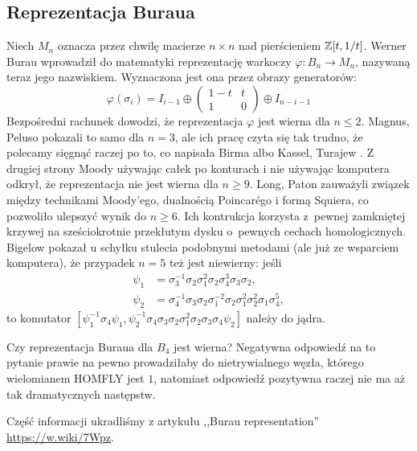 
\subsection{Reprezentacja Buraua}
Niech $M_n$ oznacza przez chwilę macierze $n \times n$ nad pierścieniem $\mathbb Z[t, 1/t]$.
Werner Burau \cite{burau1935} wprowadził do matematyki reprezentację warkoczy $\varphi \colon B_n \to M_{n}$, nazywaną teraz jego nazwiskiem.
%
%
Wyznaczona jest ona przez obrazy generatorów:
\begin{equation}
    \varphi(\sigma_i) = I_{i-1} \oplus \begin{pmatrix}
        1-t & t \\
        1   & 0
    \end{pmatrix} \oplus I_{n-i-1}
\end{equation}
Bezpośredni rachunek dowodzi, że reprezentacja $\varphi$ jest wierna dla $n \le 2$.
Magnus, Peluso \cite{magnus1969} pokazali to samo dla $n = 3$, ale ich pracę czyta się tak trudno, że polecamy sięgnąć raczej po to, co napisała Birma \cite[s. 129]{birman1974} albo Kassel, Turajew \cite[s. 110]{kassel2008}.
Z drugiej strony Moody \cite{moody1991} używając całek po konturach i nie używając komputera odkrył, że reprezentacja nie jest wierna dla $n \ge 9$.
%
Long, Paton \cite{long1993} zauważyli związek między technikami Moody'ego, dualnością Poincarégo i formą Squiera, co pozwoliło ulepszyć wynik do $n \ge 6$.
%
%
Ich kontrukcja korzysta z~pewnej zamkniętej krzywej na sześciokrotnie przekłutym dysku o~pewnych cechach homologicznych.
Bigelow \cite{bigelow1999} pokazał u schyłku stulecia podobnymi metodami (ale już ze wsparciem komputera), że przypadek $n = 5$ też jest niewierny: jeśli
%
\begin{align}
    \psi_1 & = \sigma_3^{{-1}}\sigma_2\sigma_1^2\sigma_2\sigma_4^3\sigma_3\sigma_2, \\
\psi_2 & = \sigma_4^{{-1}}\sigma_3\sigma_2\sigma_1^{{-2}}\sigma_2\sigma_1^2\sigma_2^2\sigma_1\sigma_4^5,
\end{align}
to komutator $[\psi_1^{{-1}}\sigma_4\psi_1,\psi_2^{{-1}}\sigma_4\sigma_3\sigma_2\sigma_1^2\sigma_2\sigma_3\sigma_4\psi_2]$ należy do jądra.

Czy reprezentacja Buraua dla $B_4$ jest wierna?
Negatywna odpowiedź na to pytanie prawie na pewno prowadziłaby do
nietrywialnego węzła, którego wielomianem HOMFLY jest $1$,
natomiast odpowiedź pozytywna raczej nie ma aż tak dramatycznych następstw.

Część informacji ukradliśmy z artykułu ,,Burau representation'' \url{https://w.wiki/7Wpz}.

